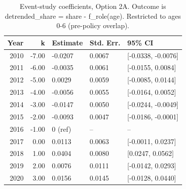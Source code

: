 \begin{table}[ht]
\centering
\caption{Event-study coefficients, Option 2A. Outcome is detrended_share = share - f_role(age). Restricted to ages 0-6 (pre-policy overlap).} 
\label{tab:phase4_within_intensive_did_prepolicy_baseline_eventstudy_2a}
\begin{tabular}{rrlll}
  \toprule
Year & k & Estimate & Std. Err. & 95\% CI \\ 
  \midrule
2010 & -7.00 & -0.0207 & 0.0067 & [-0.0338, -0.0076] \\ 
  2011 & -6.00 & -0.0035 & 0.0061 & [-0.0155, 0.0084] \\ 
  2012 & -5.00 & 0.0029 & 0.0059 & [-0.0085, 0.0144] \\ 
  2013 & -4.00 & -0.0056 & 0.0055 & [-0.0164, 0.0052] \\ 
  2014 & -3.00 & -0.0147 & 0.0050 & [-0.0244, -0.0049] \\ 
  2015 & -2.00 & -0.0093 & 0.0047 & [-0.0186, -0.0001] \\ 
  2016 & -1.00 & 0 (ref) & -- & -- \\ 
  2017 & 0.00 & 0.0113 & 0.0063 & [-0.0011, 0.0237] \\ 
  2018 & 1.00 & 0.0404 & 0.0080 & [0.0247, 0.0562] \\ 
  2019 & 2.00 & 0.0076 & 0.0111 & [-0.0142, 0.0293] \\ 
  2020 & 3.00 & 0.0156 & 0.0145 & [-0.0128, 0.0440] \\ 
   \bottomrule
\end{tabular}
\end{table}
